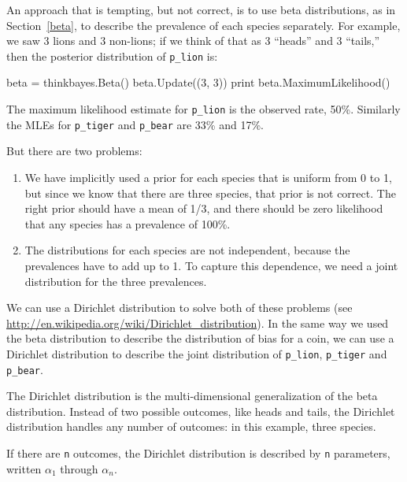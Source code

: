 \documentclass[12pt]{book}
\theoremstyle{exercise}
\begin{document}
An approach that is tempting, but not correct, is to use beta
distributions, as in Section~\ref{beta}, to describe the prevalence of
each species separately.  For example, we saw 3 lions and 3 non-lions;
if we think of that as 3 ``heads'' and 3 ``tails,'' then the posterior
distribution of \verb"p_lion" is:

\begin{code}
    beta = thinkbayes.Beta()
    beta.Update((3, 3))
    print beta.MaximumLikelihood()
\end{code}

The maximum likelihood estimate for \verb"p_lion" is the observed
rate, 50\%.  Similarly the MLEs for \verb"p_tiger" and \verb"p_bear"
are 33\% and 17\%.

But there are two problems:

\begin{enumerate}

\item We have implicitly used a prior for each species that is uniform
  from 0 to 1, but since we know that there are three species, that
  prior is not correct.  The right prior should have a mean of 1/3,
  and there should be zero likelihood that any species has a
  prevalence of 100\%.

\item The distributions for each species are not independent, because
  the prevalences have to add up to 1.  To capture this dependence, we
  need a joint distribution for the three prevalences.

\end{enumerate}

We can use a Dirichlet distribution to solve both of these problems
(see \url{http://en.wikipedia.org/wiki/Dirichlet_distribution}).  In
the same way we used the beta distribution to describe the
distribution of bias for a coin, we can use a Dirichlet
distribution to describe the joint distribution of \verb"p_lion",
\verb"p_tiger" and \verb"p_bear".

The Dirichlet distribution is the multi-dimensional generalization
of the beta distribution.  Instead of two possible outcomes, like
heads and tails, the Dirichlet distribution handles any number of
outcomes: in this example, three species.

If there are {\tt n} outcomes, the Dirichlet distribution is
described by {\tt n} parameters, written $\alpha_1$ through $\alpha_n$.
\end{document}
